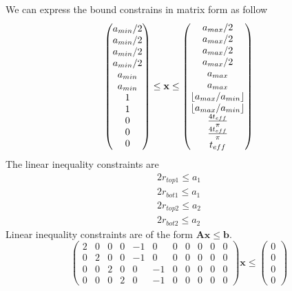 \documentclass[12pt]{article}
\numberwithin{equation}{section}
\DeclarePairedDelimiter\floor{\lfloor}{\rfloor}
\numberwithin{equation}{section}
\begin{document}
\begin{outline}[enumerate]
We can express the bound constrains in matrix form as follow
\begin{equation}
\left(
\begin{matrix}
a_{min}/2\\ 
a_{min}/2\\ 
a_{min}/2\\ 
a_{min}/2\\
a_{min}\\ 
a_{min}\\ 
1 \\    %
1 \\
0 \\
0 \\
0 
\end{matrix} \right )
\leq \mathbf{x}
 \leq 
 \left(
\begin{matrix}
a_{max}/2 \\ a_{max}/2 \\ a_{max}/2 \\ a_{max}/2 \\ a_{max} \\ a_{max} \\  \floor{a_{max}/a_{min}} \\  \floor{a_{max}/a_{min}} \\ \frac{4 t_{eff}}{\pi}  \\\frac{4 t_{eff}}{\pi} \\t_{eff}
\end{matrix} \right )
\end{equation}
The linear inequality constraints are 
\begin{align*} 
2r_{top1} \leq a_1 \\
2r_{bot1} \leq a_1\\
2r_{top2} \leq a_2\\
2r_{bot2} \leq a_2 
\end{align*}
Linear inequality constraints are of the form $\mathbf{A} \mathbf{x} \leq \mathbf{b}$.
\setcounter{MaxMatrixCols}{20}
\begin{equation}
\left(
\begin{matrix}
2 & 0 & 0 & 0 & -1 & 0 & 0 & 0 & 0 & 0 & 0 \\
0 & 2 & 0 & 0 & -1 & 0 & 0 & 0 & 0 & 0 & 0\\
0 & 0 & 2 & 0 & 0 & -1 & 0 & 0 & 0 & 0 & 0\\
0 & 0 & 0 & 2 & 0 & -1 & 0 & 0 & 0 & 0 & 0
\end{matrix}
\right ) \mathbf{x}  \leq \left ( \begin{matrix} 0\\ 0\\ 0\\ 0 \end{matrix} \right ) 

\end{equation}
\end{outline}
\end{document}
